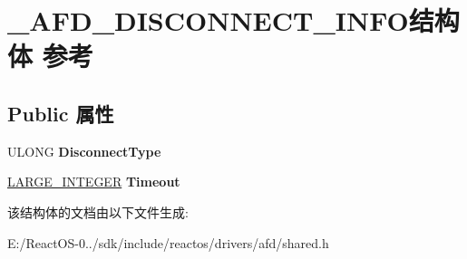 \hypertarget{struct___a_f_d___d_i_s_c_o_n_n_e_c_t___i_n_f_o}{}\section{\+\_\+\+A\+F\+D\+\_\+\+D\+I\+S\+C\+O\+N\+N\+E\+C\+T\+\_\+\+I\+N\+F\+O结构体 参考}
\label{struct___a_f_d___d_i_s_c_o_n_n_e_c_t___i_n_f_o}
\subsection*{Public 属性}
\begin{DoxyCompactItemize}
\item 
\mbox{\label{struct___a_f_d___d_i_s_c_o_n_n_e_c_t___i_n_f_o_af9a7a92f449ec8e767cb7c6a18926224}} 
U\+L\+O\+NG {\bfseries Disconnect\+Type}
\item 
\mbox{\label{struct___a_f_d___d_i_s_c_o_n_n_e_c_t___i_n_f_o_ac667c09c1a9c7f8287b3a7ebe675c0a6}} 
\hyperlink{union___l_a_r_g_e___i_n_t_e_g_e_r}{L\+A\+R\+G\+E\+\_\+\+I\+N\+T\+E\+G\+ER} {\bfseries Timeout}
\end{DoxyCompactItemize}


该结构体的文档由以下文件生成\+:\begin{DoxyCompactItemize}
\item 
E\+:/\+React\+O\+S-\/0../sdk/include/reactos/drivers/afd/shared.\+h\end{DoxyCompactItemize}
